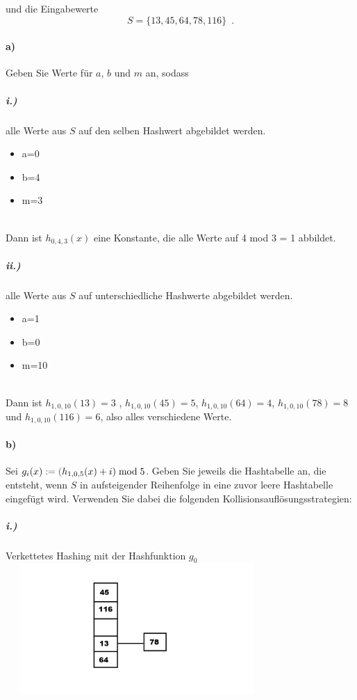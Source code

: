 \documentclass[paper=a4, fontsize=11pt]{scrartcl}
\numberwithin{equation}{section}
\numberwithin{figure}{section}
\numberwithin{table}{section}
\begin{document}
und die Eingabewerte
$$S = \{13,45,64,78,116\}\enspace.$$

\paragraph{a)}
 Geben Sie Werte für $a$, $b$ und $m$ an, sodass

\subparagraph{i.)}
 alle Werte aus $S$ auf den selben Hashwert abgebildet werden. \\
  \begin{itemize}
 \item a=0
 \item b=4
 \item m=3
 \end{itemize} \\
 
 Dann ist $h_{0,4,3}(x)$ eine Konstante, die alle Werte auf 4 mod 3 = 1 abbildet.
 
\subparagraph{ii.)}
alle Werte aus $S$ auf unterschiedliche Hashwerte abgebildet werden. \\
 \begin{itemize}
 \item a=1
 \item b=0
 \item m=10
 \end{itemize} \\
 
 Dann ist $h_{1,0,10}(13)=3$ , $h_{1,0,10}(45)=5$, $h_{1,0,10}(64)=4$, $h_{1,0,10}(78)=8$ und $h_{1,0,10}(116)=6$, also alles verschiedene Werte.    

\paragraph{b)} 
Sei $g_i(x) \; {\color{darkgray}:=(}  h_{1,0,5}(x) + i) \bmod 5$. Geben Sie jeweils die Hashtabelle an, die entsteht, wenn $S$ in aufsteigender Reihenfolge in eine zuvor leere Hashtabelle eingefügt wird. Verwenden Sie dabei die folgenden Kollisionsauflösungsstrategien:

\subparagraph{i.)}
Verkettetes Hashing mit der Hashfunktion $g_0$ \\

\includegraphics[width=10cm,height=5cm]{hashbi.png} \\
\end{document}
